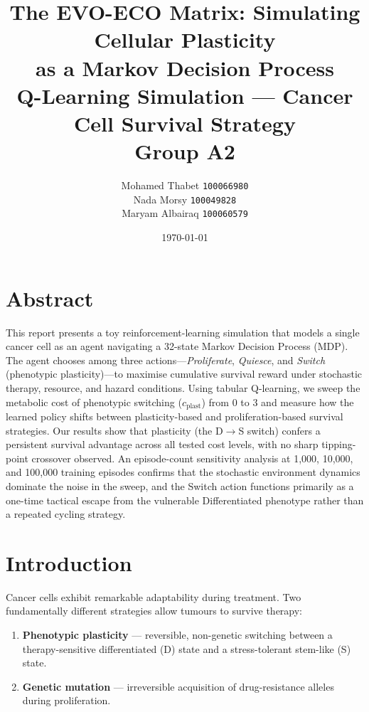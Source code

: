 \documentclass[12pt,a4paper]{article}
\title{
    \textbf{The EVO-ECO Matrix: Simulating Cellular Plasticity\\as a Markov Decision Process}\\[0.5em]
    \large Q-Learning Simulation --- Cancer Cell Survival Strategy\\[1em]
    \normalsize Group A2
}
\author{
    Mohamed Thabet \quad \texttt{100066980}\\
    Nada Morsy \quad \texttt{100049828}\\
    Maryam Albairaq \quad \texttt{100060579}
}
\date{\today}
\begin{document}
\maketitle
\thispagestyle{empty}
\newpage
\tableofcontents
\newpage

\section{Abstract}

This report presents a toy reinforcement-learning simulation that models a single cancer cell as an agent navigating a 32-state Markov Decision Process (MDP). The agent chooses among three actions---\emph{Proliferate}, \emph{Quiesce}, and \emph{Switch} (phenotypic plasticity)---to maximise cumulative survival reward under stochastic therapy, resource, and hazard conditions. Using tabular Q-learning, we sweep the metabolic cost of phenotypic switching ($c_{\text{plast}}$) from 0 to 3 and measure how the learned policy shifts between plasticity-based and proliferation-based survival strategies. Our results show that plasticity (the D$\to$S switch) confers a persistent survival advantage across all tested cost levels, with no sharp tipping-point crossover observed. An episode-count sensitivity analysis at 1{,}000, 10{,}000, and 100{,}000 training episodes confirms that the stochastic environment dynamics dominate the noise in the sweep, and the Switch action functions primarily as a one-time tactical escape from the vulnerable Differentiated phenotype rather than a repeated cycling strategy.

\section{Introduction}

Cancer cells exhibit remarkable adaptability during treatment. Two fundamentally different strategies allow tumours to survive therapy:

\begin{enumerate}
    \item \textbf{Phenotypic plasticity} --- reversible, non-genetic switching between a therapy-sensitive differentiated (D) state and a stress-tolerant stem-like (S) state.
    \item \textbf{Genetic mutation} --- irreversible acquisition of drug-resistance alleles during proliferation.
\end{enumerate}
\end{document}
